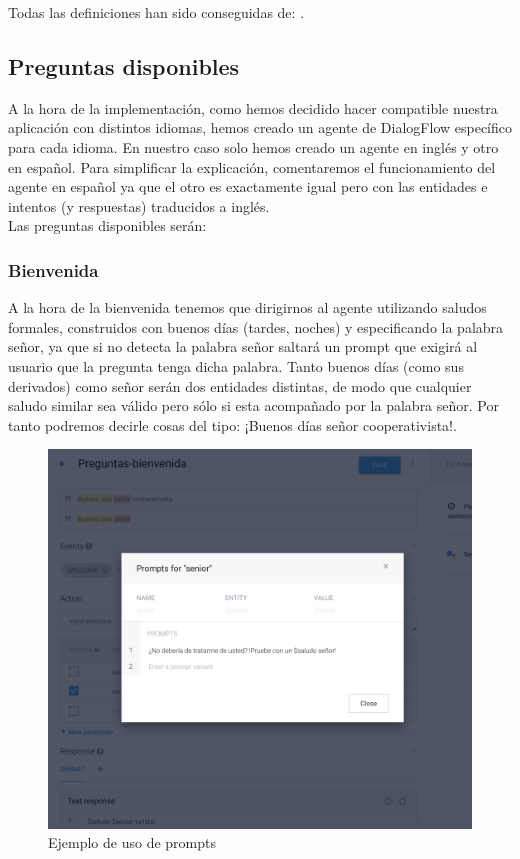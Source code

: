 Todas las definiciones han sido conseguidas de: \cite{dialogo}.
\subsection{Preguntas disponibles}
A la hora de la implementación, como hemos decidido hacer compatible nuestra aplicación con distintos idiomas, hemos creado un agente de DialogFlow específico para cada idioma. En nuestro caso solo hemos creado un agente en inglés y otro en español. Para simplificar la explicación, comentaremos el funcionamiento del agente  en español ya que el otro es exactamente igual pero con las entidades e intentos (y respuestas) traducidos a inglés. \\

Las preguntas disponibles serán:

\subsubsection{Bienvenida}

A la hora de la bienvenida tenemos que dirigirnos al agente utilizando saludos formales, construidos con buenos días (tardes, noches) y especificando la palabra señor, ya que si no detecta la palabra señor saltará un prompt que exigirá al usuario que la pregunta tenga dicha palabra. Tanto buenos días (como sus derivados) como señor serán dos entidades distintas, de modo que cualquier saludo similar sea válido pero sólo si esta acompañado por la palabra señor. Por tanto podremos decirle cosas del tipo: ¡Buenos días señor cooperativista!. \\

\begin{figure}[H] %
	\centering
	\includegraphics[scale=0.3]{imagenes/promts.png}  %
	\caption{Ejemplo de uso de prompts}
\end{figure}


